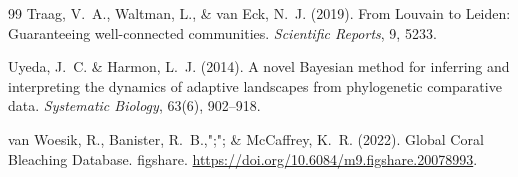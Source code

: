 \documentclass[12pt]{article}
\begin{document}
\begin{thebibliography}{99}
Traag, V.~A., Waltman, L., \& van Eck, N.~J. (2019).
\newblock From {Louvain} to {Leiden}: Guaranteeing well-connected communities.
\newblock \emph{Scientific Reports}, 9, 5233.

Uyeda, J.~C. \& Harmon, L.~J. (2014).
\newblock A novel {Bayesian} method for inferring and interpreting the dynamics of adaptive landscapes from phylogenetic comparative data.
\newblock \emph{Systematic Biology}, 63(6), 902--918.

van Woesik, R., Banister, R.~B.,";"; \& McCaffrey, K.~R. (2022).
\newblock Global Coral Bleaching Database.
\newblock figshare. \url{https://doi.org/10.6084/m9.figshare.20078993}.

\end{thebibliography}
\end{document}
